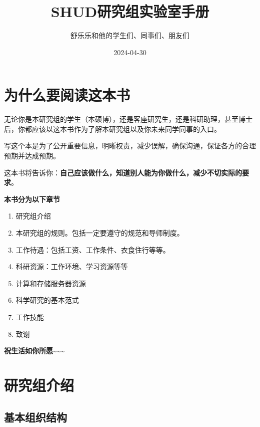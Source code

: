 \documentclass[
]{ctexbook}
\title{SHUD研究组实验室手册}
\author{舒乐乐和他的学生们、同事们、朋友们}
\date{2024-04-30}
\providecommand{\tightlist}{%
  \setlength{\itemsep}{0pt}\setlength{\parskip}{0pt}}
\begin{document}
\maketitle

{
\setcounter{tocdepth}{1}
\tableofcontents
}
\hypertarget{ux4e3aux4ec0ux4e48ux8981ux9605ux8bfbux8fd9ux672cux4e66}{%
\chapter*{为什么要阅读这本书}\label{ux4e3aux4ec0ux4e48ux8981ux9605ux8bfbux8fd9ux672cux4e66}}

无论你是本研究组的学生（本硕博），还是客座研究生，还是科研助理，甚至博士后，你都应该以这本书作为了解本研究组以及你未来同学同事的入口。

写这个本是为了公开重要信息，明晰权责，减少误解，确保沟通，保证各方的合理预期并达成预期。

这本书将告诉你：\textbf{自己应该做什么，知道别人能为你做什么，减少不切实际的要求}。

\textbf{本书分为以下章节}

\begin{enumerate}
\def\labelenumi{\arabic{enumi}.}
\tightlist
\item
  研究组介绍
\item
  本研究组的规则。包括一定要遵守的规范和导师制度。
\item
  工作待遇：包括工资、工作条件、衣食住行等等。
\item
  科研资源：工作环境、学习资源等等
\item
  计算和存储服务器资源
\item
  科学研究的基本范式
\item
  工作技能
\item
  致谢
\end{enumerate}

\textbf{祝生活如你所愿\textasciitilde\textasciitilde\textasciitilde{}}

\hypertarget{intro}{%
\chapter{研究组介绍}\label{intro}}

\hypertarget{ux57faux672cux7ec4ux7ec7ux7ed3ux6784}{%
\section{基本组织结构}\label{ux57faux672cux7ec4ux7ec7ux7ed3ux6784}}
\end{document}
